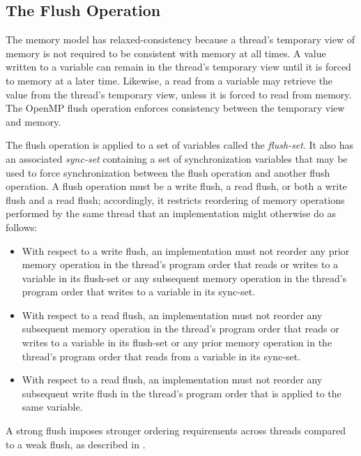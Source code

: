 \subsection{The Flush Operation}
\label{subsec:The Flush Operation}

The memory model has relaxed-consistency because a thread's temporary view of
memory is not required to be consistent with memory at all times. A value written to a
variable can remain in the thread's temporary view until it is forced to memory at a later
time. Likewise, a read from a variable may retrieve the value from the thread's
temporary view, unless it is forced to read from memory. The OpenMP flush operation
enforces consistency between the temporary view and memory.

The flush operation is applied to a set of variables called the
\emph{flush-set}. It also has an associated \emph{sync-set}
containing a set of synchronization variables that may be used to force
synchronization between the flush operation and another flush operation.  A flush operation
must be a write flush, a read flush, or both a write flush and a
read flush; accordingly, it restricts reordering of memory operations
performed by the same thread that an implementation might otherwise do as
follows:

\begin{itemize}
\item With respect to a write flush, an implementation must not reorder any
    prior memory operation in the thread's program order that reads or writes
    to a variable in its flush-set or any subsequent memory operation in the
    thread's program order that writes to a variable in its sync-set.

\item With respect to a read flush, an implementation must not reorder any
    subsequent memory operation in the thread's program order that reads or
    writes to a variable in its flush-set or any prior memory operation in the
    thread's program order that reads from a variable in its sync-set.

\item With respect to a read flush, an implementation must not reorder any
    subsequent write flush in the thread's program order that is applied to
    the same variable.
\end{itemize}

A strong flush imposes stronger ordering requirements across threads
compared to a weak flush, as described in
.

